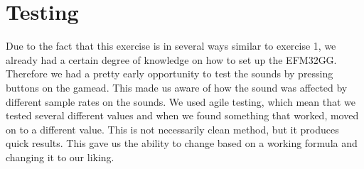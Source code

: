 \section{Testing}

Due to the fact that this exercise is in several ways similar to exercise 1, we
already had a certain degree of knowledge on how to set up the EFM32GG.
Therefore we had a pretty early opportunity to test the sounds by pressing
buttons on the gamead. This made us aware of how the sound was affected by
different sample rates on the sounds. We used agile testing, which mean that we tested
several different values and when we found something that worked, moved on to a
different value. This is not necessarily clean method, but it produces quick
results. This gave us the ability to change based on a working formula and
changing it to our liking.
